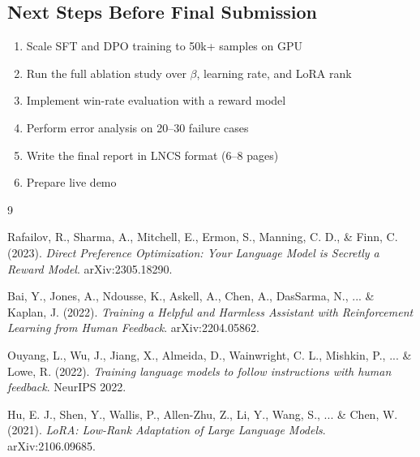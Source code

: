 \documentclass[12pt,a4paper]{article}
\begin{document}
\subsection*{Next Steps Before Final Submission}

\begin{enumerate}[noitemsep]
    \item Scale SFT and DPO training to 50k+ samples on GPU
    \item Run the full ablation study over $\beta$, learning rate, and LoRA rank
    \item Implement win-rate evaluation with a reward model
    \item Perform error analysis on 20--30 failure cases
    \item Write the final report in LNCS format (6--8 pages)
    \item Prepare live demo
\end{enumerate}

\begin{thebibliography}{9}

Rafailov, R., Sharma, A., Mitchell, E., Ermon, S., Manning, C. D., \& Finn, C. (2023).
\textit{Direct Preference Optimization: Your Language Model is Secretly a Reward Model}.
arXiv:2305.18290.

Bai, Y., Jones, A., Ndousse, K., Askell, A., Chen, A., DasSarma, N., ... \& Kaplan, J. (2022).
\textit{Training a Helpful and Harmless Assistant with Reinforcement Learning from Human Feedback}.
arXiv:2204.05862.

Ouyang, L., Wu, J., Jiang, X., Almeida, D., Wainwright, C. L., Mishkin, P., ... \& Lowe, R. (2022).
\textit{Training language models to follow instructions with human feedback}.
NeurIPS 2022.

Hu, E. J., Shen, Y., Wallis, P., Allen-Zhu, Z., Li, Y., Wang, S., ... \& Chen, W. (2021).
\textit{LoRA: Low-Rank Adaptation of Large Language Models}.
arXiv:2106.09685.

\end{thebibliography}
\end{document}

